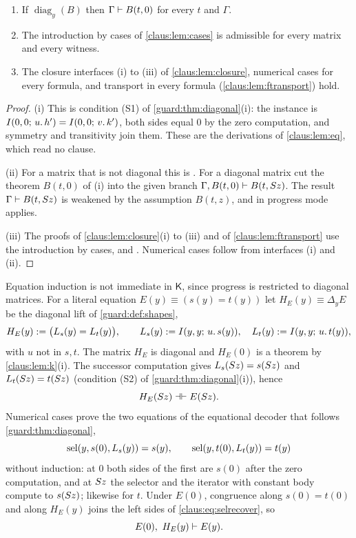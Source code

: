 \begin{lemma}
\label{claus:lem:k}
\begin{enumerate}[label=(\roman*)]
\item If $\operatorname{diag}_y(B)$ then $\Gamma\vdash B(t,0)$ for every
$t$ and $\Gamma$.
\item The introduction by cases of \cref{claus:lem:cases} is admissible for
every matrix and every witness.
\item The closure interfaces (i) to (iii) of \cref{claus:lem:closure},
numerical cases for every formula, and transport in every formula
(\cref{claus:lem:ftransport}) hold.
\end{enumerate}
\end{lemma}
\begin{proof}
(i) This is condition (S1) of \cref{guard:thm:diagonal}(i): the instance
is $I(0,0;\,u.\,h')=I(0,0;\,v.\,k')$, both sides equal $0$ by the zero
computation, and symmetry and transitivity join them. These are the
derivations of \cref{claus:lem:eq}, which read no clause.

(ii) For a matrix that is not diagonal this is . For a
diagonal matrix cut the theorem $B(t,0)$ of (i) into the given branch
$\Gamma,B(t,0)\vdash B(t,S z)$. The result
$\Gamma\vdash B(t,S z)$ is weakened by the assumption $B(t,z)$, and
 in progress mode applies.

(iii) The proofs of \cref{claus:lem:closure}(i) to (iii) and of
\cref{claus:lem:ftransport} use the introduction by cases, 
and . Numerical cases follow from interfaces (i) and (ii).
\end{proof}

Equation induction is not immediate in $\mathsf{K}$, since progress is
restricted to diagonal matrices. For a literal equation
$E(y)\equiv(s(y)=t(y))$ let $H_E(y)\equiv\Delta_yE$ be the diagonal lift
of \cref{guard:def:shapes},
\[
 H_E(y)\mathrel{:=}\bigl(L_s(y)=L_t(y)\bigr),\qquad
 L_s(y)\mathrel{:=}I(y,y;\,u.\,s(y)),\quad L_t(y)\mathrel{:=}I(y,y;\,u.\,t(y)),
\]
with $u$ not in $s,t$. The matrix $H_E$ is diagonal and $H_E(0)$ is a
theorem by \cref{claus:lem:k}(i). The successor computation gives
$L_s(S z)=s(S z)$ and $L_t(S z)=t(S z)$ (condition (S2) of
\cref{guard:thm:diagonal}(i)), hence
\begin{equation}
\label{claus:eq:liftsucc}
 H_E(S z)\dashv\vdash E(S z).
\end{equation}
Numerical cases prove the two equations of the equational decoder that
follows \cref{guard:thm:diagonal},
\begin{equation}
\label{claus:eq:selrecover}
 \operatorname{sel}(y,s(0),L_s(y))=s(y),\qquad \operatorname{sel}(y,t(0),L_t(y))=t(y)
\end{equation}
without induction: at $0$ both sides of the first are $s(0)$ after the
zero computation, and at $S z$ the selector and the iterator with
constant body compute to $s(S z)$; likewise for $t$. Under $E(0)$,
congruence along $s(0)=t(0)$ and along $H_E(y)$ joins the left sides of
\eqref{claus:eq:selrecover}, so
\begin{equation}
\label{claus:eq:recovery}
 E(0),\ H_E(y)\vdash E(y).
\end{equation}

